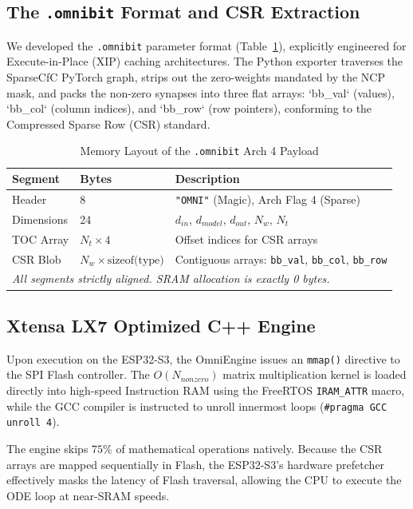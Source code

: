 \documentclass[lettersize,journal]{IEEEtran}
\begin{document}
\subsection{The \texttt{.omnibit} Format and CSR Extraction}
We developed the \texttt{.omnibit} parameter format (Table~\ref{tab:omnibit_layout}), explicitly engineered for Execute-in-Place (XIP) caching architectures. The Python exporter traverses the SparseCfC PyTorch graph, strips out the zero-weights mandated by the NCP mask, and packs the non-zero synapses into three flat arrays: `bb_val` (values), `bb_col` (column indices), and `bb_row` (row pointers), conforming to the Compressed Sparse Row (CSR) standard. 

\begin{table}[h]
\centering
\caption{Memory Layout of the \texttt{.omnibit} Arch 4 Payload}
\label{tab:omnibit_layout}
\begin{tabular}{|l|l|p{4cm}|}
\hline
\textbf{Segment} & \textbf{Bytes} & \textbf{Description} \\ \hline
Header           & 8  & \texttt{"OMNI"} (Magic), Arch Flag 4 (Sparse) \\ \hline
Dimensions       & 24 & $d_{in}$, $d_{model}$, $d_{out}$, $N_w$, $N_t$ \\ \hline
TOC Array        & $N_t \!\times\! 4$ & Offset indices for CSR arrays \\ \hline
CSR Blob         & $N_w \!\times\! \text{sizeof(type)}$ & Contiguous arrays: \texttt{bb\_val}, \texttt{bb\_col}, \texttt{bb\_row} \\ \hline
\multicolumn{3}{|l|}{\small\textit{All segments strictly aligned. SRAM allocation is exactly 0 bytes.}} \\ \hline
\end{tabular}
\end{table}

\subsection{Xtensa LX7 Optimized C++ Engine}
Upon execution on the ESP32-S3, the OmniEngine issues an \texttt{mmap()} directive to the SPI Flash controller. The $O(N_{nonzero})$ matrix multiplication kernel is loaded directly into high-speed Instruction RAM using the FreeRTOS \texttt{IRAM\_ATTR} macro, while the GCC compiler is instructed to unroll innermost loops (\texttt{\#pragma GCC unroll 4}). 

The engine skips $75\%$ of mathematical operations natively. Because the CSR arrays are mapped sequentially in Flash, the ESP32-S3's hardware prefetcher effectively masks the latency of Flash traversal, allowing the CPU to execute the ODE loop at near-SRAM speeds.
\end{document}

